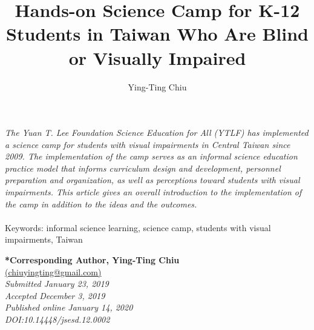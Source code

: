 \documentclass[11.5pt]{sig-alternate} %
\makeatletter
\let\oldabstract\abstract
\let\oldendabstract\endabstract
\renewenvironment{abstract}
{\renewenvironment{quotation}%
               {\list{}{\addtolength{\leftmargin}{1em} %
                        \listparindent 1.5em%
                        \itemindent    \listparindent%
                        \rightmargin   \leftmargin%
                        \parsep        \z@ \@plus\p@}%
                \item\relax}%
               {\endlist}%
\oldabstract}
{\oldendabstract}
\makeatother
\begin{document}
\title{Hands-on Science Camp for K-12 Students in Taiwan Who Are Blind or Visually Impaired}

\author[1]{\large \color{blue}Ying-Ting Chiu}


\toappear{}
\maketitle
\begin{@twocolumnfalse} 
\begin{abstract}
\item 
\textit {The Yuan T. Lee Foundation Science Education for All (YTLF) has implemented a science camp for students with visual impairments in Central Taiwan since 2009. The implementation of the camp serves as an informal science education practice model that informs curriculum design and development, personnel preparation and organization, as well as perceptions toward students with visual impairments. This article gives an overall introduction to the implementation of the camp in addition to the ideas and the outcomes.}
\\ \\
Keywords: informal science learning, science camp, students with visual impairments, Taiwan
\end{abstract}
\end{@twocolumnfalse}


\textbf{*Corresponding Author, Ying-Ting Chiu}\\
\href{mailto: chiuyingting@gmail.com}{(chiuyingting@gmail.com)} \\
\textit{Submitted January 23, 2019 }\\
\textit{Accepted December 3, 2019} \\
\textit{Published online January 14, 2020} \\
\textit{DOI:10.14448/jsesd.12.0002} \\
\pagebreak
\clearpage
\end{document}
